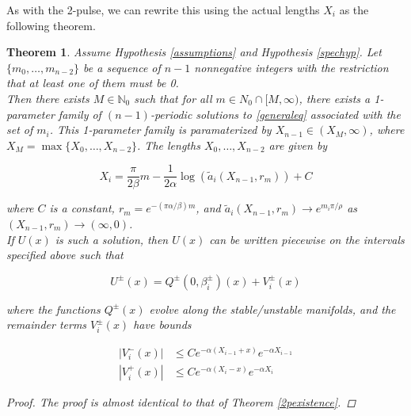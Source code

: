 \documentclass[12pt]{article}
\def\N{{\mathbb N}}
\newtheorem{theorem}{Theorem}
\begin{document}
As with the 2-pulse, we can rewrite this using the actual lengths $X_i$ as the following theorem.


\begin{theorem}\label{multiexistence}
Assume Hypothesis \ref{assumptions} and Hypothesis \ref{spechyp}. Let $\{ m_0, \dots, m_{n-2} \}$ be a sequence of $n - 1$ nonnegative integers with the restriction that at least one of them must be 0. \\

Then there exists $M \in \N_0$ such that for all $m \in N_0 \cap [M, \infty)$, there exists a 1-parameter family of $(n-1)$-periodic solutions to \eqref{generaleq} associated with the set of $m_i$. This 1-parameter family is paramaterized by $X_{n-1} \in (X_M, \infty)$, where $X_M = \max\{X_0, \dots, X_{n-2} \}$. The lengths $X_0, \dots, X_{n-2}$ are given by

\begin{equation}\label{Xi}
X_i = \frac{\pi}{2 \beta}m 
- \frac{1}{2 \alpha} \log(\tilde{a}_i(X_{n-1}, r_m)) + C
\end{equation}

where $C$ is a constant, $r_m = e^{-(\pi \alpha/\beta)m}$, and $\tilde{a}_i(X_{n-1}, r_m) \rightarrow e^{m_i \pi / \rho}$ as $(X_{n-1}, r_m) \rightarrow (\infty, 0)$. \\

If $U(x)$ is such a solution, then $U(x)$ can be written piecewise on the intervals specified above such that

\begin{equation}
U^\pm(x) = Q^\pm(0, \beta_i^\pm)(x) + V_i^\pm(x)
\end{equation}

where the functions $Q^\pm(x)$ evolve along the stable/unstable manifolds, and the remainder terms $V_i^\pm(x)$ have bounds

\begin{align}
|V_i^-(x)| &\leq C e^{-\alpha(X_{i-1} + x)}e^{-\alpha X_{i-1}} \\
|V_i^+(x)| &\leq C e^{-\alpha(X_i - x)}e^{-\alpha X_i} 
\end{align} 

\begin{proof}
The proof is almost identical to that of Theorem \ref{2pexistence}.
\end{proof}

\end{theorem}
\end{document}

